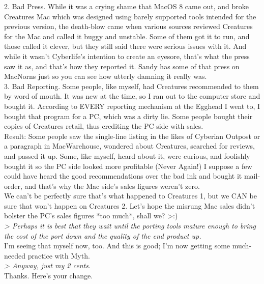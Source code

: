 \documentclass[11pt,twoside,a4paper]{article}
\begin{document}
\begin{multicols*}{2}
2. Bad Press. While it was a crying shame that MacOS 8 came out, and broke Creatures Mac which was designed using barely supported tools intended for the previous version, the death-blow came when various sources reviewed Creatures for the Mac and called it buggy and unstable. Some of them got it to run, and those called it clever, but they still said there were serious issues with it. And while it wasn't Cyberlife's intention to create an eyesore, that's what the press saw it as, and that's how they reported it. Sandy has some of that press on MacNorns just so you can see how utterly damning it really was.~\\

3. Bad Reporting. Some people, like myself, had Creatures recommended to them by word of mouth. It was new at the time, so I ran out to the computer store and bought it. According to EVERY reporting mechanism at the Egghead I went to, I bought that program for a PC, which was a dirty lie. Some people bought their copies of Creatures retail, thus crediting the PC side with sales.~\\

Result: Some people saw the single-line listing in the likes of Cyberian Outpost or a paragraph in MacWarehouse, wondered about Creatures, searched for reviews, and passed it up. Some, like myself, heard about it, were curious, and foolishly bought it so the PC side looked more profitable (Never Again!) I suppose a few could have heard the good recommendations over the bad ink and bought it mail-order, and that's why the Mac side's sales figures weren't zero.~\\

We can't be perfectly sure that's what happened to Creatures 1, but we CAN be sure that won't happen on Creatures 2. Let's hope the misrung Mac sales didn't bolster the PC's sales figures *too much*, shall we? >:)~\\

\emph{> Perhaps it is best that they wait until the porting tools mature enough to bring the cost of the port down and the quality of the end product up.}~\\

I'm seeing that myself now, too. And this is good; I'm now getting some much-needed practice with Myth.~\\

\emph{> Anyway, just my 2 cents.}~\\

Thanks. Here's your change.~\\


\end{multicols*}
\end{document}
